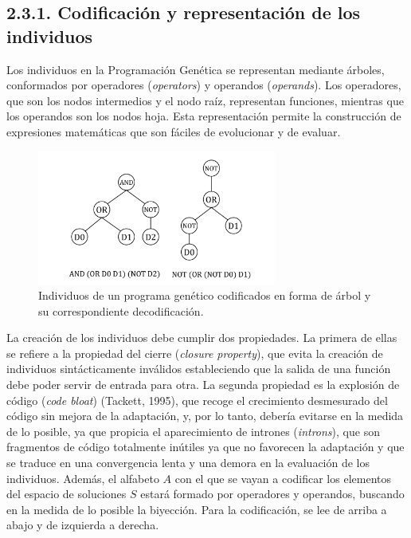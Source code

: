 \documentclass[spanish,a4paper,12pt,twoside]{report}
\begin{document}
    \subsection*{\large 2.3.1. Codificación y representación de los individuos}
    Los individuos en la Programación Genética se representan mediante árboles, conformados por operadores (\emph{operators}) y operandos (\emph{operands}). Los operadores, que son los nodos intermedios y el nodo raíz, representan funciones, mientras que los operandos son los nodos hoja. Esta representación permite la construcción de expresiones matemáticas que son fáciles de evolucionar y de evaluar.
    \begin{figure}[H]
      \centering
      \includegraphics[width = 0.7\textwidth]{resources/Fig2.pdf}
      \caption{Individuos de un programa genético codificados en forma de árbol y su correspondiente decodificación.}
      \label{fig:2}
    \end{figure} \par
    La creación de los individuos debe cumplir dos propiedades. La primera de ellas se refiere a la propiedad del cierre (\emph{closure property}), que evita la creación de individuos sintácticamente inválidos estableciendo que la salida de una función debe poder servir de entrada para otra. La segunda propiedad es la explosión de código (\emph{code bloat}) (Tackett, 1995), que recoge el crecimiento desmesurado del código sin mejora de la adaptación, y, por lo tanto, debería evitarse en la medida de lo posible, ya que propicia el aparecimiento de intrones (\emph{introns}), que son fragmentos de código totalmente inútiles ya que no favorecen la adaptación y que se traduce en una convergencia lenta y una demora en la evaluación de los individuos. Además, el alfabeto $A$ con el que se vayan a codificar los elementos del espacio de soluciones $S$ estará formado por operadores y operandos, buscando en la medida de lo posible la biyección. Para la codificación, se lee de arriba a abajo y de izquierda a derecha.
  
\end{document}

